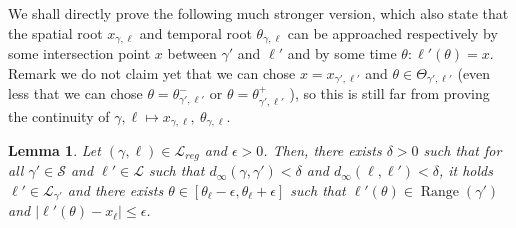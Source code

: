 \documentclass[11pt]{article}
\newtheorem{lemma}[theorem]{Lemma}
\DeclareMathOperator{\Range}{Range}
\begin{document}
    We shall directly prove the following much stronger version, which also state that the spatial root  $x_{\gamma,\ell}$ and temporal root $\theta_{\gamma,\ell}$ can be approached respectively by {some} intersection point $x$ between $\gamma'$ and $\ell'$ and by {some} time $\theta: \ell'(\theta)=x$. Remark we do not claim yet that we can chose $x=x_{\gamma',\ell'}$ and $\theta\in \Theta_{\gamma',\ell'}$
(even less that we can chose $\theta=\theta^-_{\gamma',\ell'}$ or $\theta=\theta^+_{\gamma',\ell'}$  ), so this is still far from proving the continuity of $\gamma,\ell\mapsto x_{\gamma,\ell}, \ \theta_{\gamma,\ell}$.
\begin{lemma}
  \label{le:notstupid}
    Let $(\gamma,\ell)\in \mathscr{L}_{reg}$ and $\epsilon>0$. Then, there exists $\delta>0$ such that for all $\gamma'\in \mathscr{S}$ and $\ell'\in \mathscr{L}$ such that $d_\infty(\gamma,\gamma')<\delta$ and $d_\infty(\ell,\ell')<\delta$, it holds $\ell'\in \mathscr{L}_{\gamma'}$
    and there exists $\theta\in [\theta_\ell-\epsilon,\theta_\ell+\epsilon]$ such that $\ell'(\theta)\in \Range(\gamma')$ and $|\ell'(\theta)- x_\ell |\leq \epsilon$.
\end{lemma}
\end{document}
